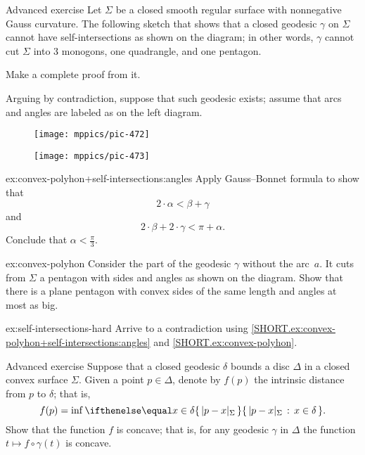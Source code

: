 \begin{thm}{Advanced exercise}\label{ex:convex-polyhon+self-intersections}
Let $\Sigma$ be a closed smooth regular surface with nonnegative Gauss curvature.
The following sketch that shows that a closed geodesic $\gamma$ on $\Sigma$ cannot have self-intersections as shown on the diagram;
in other words, $\gamma$ cannot cut $\Sigma$ into 3 monogons, one quadrangle, and one pentagon. 

Make a complete proof from it.

Arguing by contradiction, suppose that such geodesic exists;
assume that arcs and angles are labeled as on the left diagram.

\begin{figure}[h!]
\begin{minipage}{.38\textwidth}
\centering
\texttt{[image: mppics/pic-472]}
\end{minipage}\hfill
\begin{minipage}{.58\textwidth}
\centering
\texttt{[image: mppics/pic-473]}
\end{minipage}
\end{figure}

\begin{subthm}{ex:convex-polyhon+self-intersections:angles}
Apply Gauss--Bonnet formula to show that
\[2\cdot\alpha<\beta+\gamma\]
and 
\[2\cdot\beta+2\cdot \gamma<\pi+\alpha.\]
Conclude that $\alpha <\tfrac \pi 3$.
\end{subthm}

\begin{subthm}{ex:convex-polyhon}
Consider the part of the geodesic $\gamma$ without the arc~$a$.
It cuts from $\Sigma$ a pentagon with sides and angles as shown on the diagram. 
Show that there is a plane pentagon with convex sides of the same length and angles at most as big.
\end{subthm}

\begin{subthm}{ex:self-intersections-hard}
Arrive to a contradiction using \ref{SHORT.ex:convex-polyhon+self-intersections:angles} and \ref{SHORT.ex:convex-polyhon}. 
\end{subthm}

\end{thm}



\begin{thm}{Advanced exercise}\label{ex:dist-to-bry}
Suppose that a closed geodesic $\delta$ bounds a disc $\Delta$ in a closed convex surface $\Sigma$.
Given a point $p\in\Delta$, denote by $f(p)$ the intrinsic distance from $p$ to $\delta$;
that is,
\[f(p)=\inf\set{|p-x|_\Sigma}{x\in\delta}.\]
Show that the function $f$ is concave;
that is, for any geodesic $\gamma$ in $\Delta$ the function $t\mapsto f\circ\gamma(t)$ is concave.
\end{thm}


